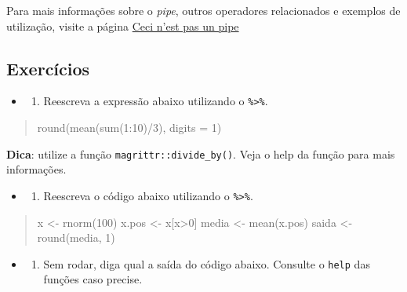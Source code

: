 \documentclass[]{book}
\providecommand{\tightlist}{%
  \setlength{\itemsep}{0pt}\setlength{\parskip}{0pt}}
\begin{document}
Para mais informações sobre o \emph{pipe}, outros operadores relacionados e exemplos de utilização, visite a página \href{https://cran.r-project.org/web/packages/magrittr/vignettes/magrittr.html}{Ceci n'est pas un pipe}

\hypertarget{exercuxedcios-4}{%
\subsection{Exercícios}\label{exercuxedcios-4}}

\begin{itemize}
\item
  \begin{enumerate}
  \def\labelenumi{\arabic{enumi}.}
  \tightlist
  \item
    Reescreva a expressão abaixo utilizando o \texttt{\%\textgreater{}\%}.
  \end{enumerate}
\end{itemize}

\begin{quote}
round(mean(sum(1:10)/3), digits = 1)
\end{quote}

\textbf{Dica}: utilize a função \texttt{magrittr::divide\_by()}. Veja o help da função para mais informações.

\begin{itemize}
\item
  \begin{enumerate}
  \def\labelenumi{\arabic{enumi}.}
  \setcounter{enumi}{1}
  \tightlist
  \item
    Reescreva o código abaixo utilizando o \texttt{\%\textgreater{}\%}.
  \end{enumerate}
\end{itemize}

\begin{quote}
x \textless- rnorm(100)
x.pos \textless- x{[}x\textgreater0{]}
media \textless- mean(x.pos)
saida \textless- round(media, 1)
\end{quote}

\begin{itemize}
\item
  \begin{enumerate}
  \def\labelenumi{\arabic{enumi}.}
  \setcounter{enumi}{2}
  \tightlist
  \item
    Sem rodar, diga qual a saída do código abaixo. Consulte o \texttt{help} das funções caso precise.
  \end{enumerate}
\end{itemize}
\end{document}
